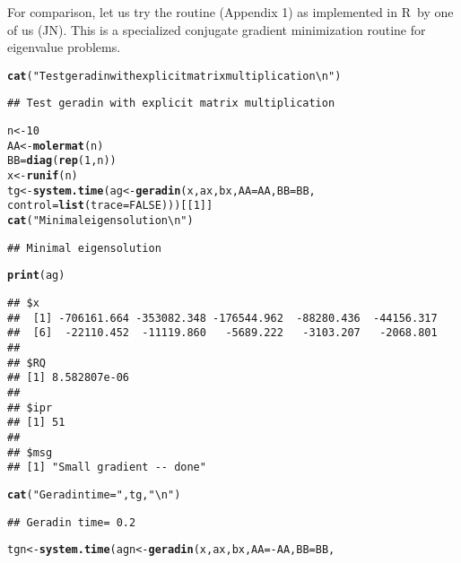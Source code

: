 \documentclass[10pt]{article}\usepackage[]{graphicx}\usepackage[]{color}
\makeatletter
\newcommand{\hlnum}[1]{\textcolor[rgb]{0.686,0.059,0.569}{#1}}%
\newcommand{\hlstr}[1]{\textcolor[rgb]{0.192,0.494,0.8}{#1}}%
\newcommand{\hlopt}[1]{\textcolor[rgb]{0,0,0}{#1}}%
\newcommand{\hlstd}[1]{\textcolor[rgb]{0.345,0.345,0.345}{#1}}%
\newcommand{\hlkwb}[1]{\textcolor[rgb]{0.69,0.353,0.396}{#1}}%
\newcommand{\hlkwc}[1]{\textcolor[rgb]{0.333,0.667,0.333}{#1}}%
\newcommand{\hlkwd}[1]{\textcolor[rgb]{0.737,0.353,0.396}{\textbf{#1}}}%
\newenvironment{kframe}{%
 \def\at@end@of@kframe{}%
 \ifinner\ifhmode%
  \def\at@end@of@kframe{\end{minipage}}%
  \begin{minipage}{\columnwidth}%
 \fi\fi%
 \def\FrameCommand##1{\hskip\@totalleftmargin \hskip-\fboxsep
 \colorbox{shadecolor}{##1}\hskip-\fboxsep
     \hskip-\linewidth \hskip-\@totalleftmargin \hskip\columnwidth}%
 \MakeFramed {\advance\hsize-\width
   \@totalleftmargin\z@ \linewidth\hsize
   \@setminipage}}%
 {\par\unskip\endMakeFramed%
 \at@end@of@kframe}
\newenvironment{knitrout}{}{} %
\newcommand{\R}{{\sf R\ }}
\makeatother
\begin{document}
For comparison, let us try the \cite{Geradin71} routine (Appendix 1) as implemented in \R by one of 
us (JN). This is a specialized conjugate gradient minimization routine for eigenvalue problems.



\begin{knitrout}\scriptsize
{}\color{fgcolor}\begin{kframe}
\begin{alltt}
\hlkwd{cat}\hlstd{(}\hlstr{"Test geradin with explicit matrix multiplication\textbackslash{}n"}\hlstd{)}
\end{alltt}
\begin{verbatim}
## Test geradin with explicit matrix multiplication
\end{verbatim}
\begin{alltt}
\hlstd{n}\hlkwb{<-}\hlnum{10}
\hlstd{AA}\hlkwb{<-}\hlkwd{molermat}\hlstd{(n)}
\hlstd{BB}\hlkwb{=}\hlkwd{diag}\hlstd{(}\hlkwd{rep}\hlstd{(}\hlnum{1}\hlstd{,n))}
\hlstd{x}\hlkwb{<-}\hlkwd{runif}\hlstd{(n)}
\hlstd{tg}\hlkwb{<-}\hlkwd{system.time}\hlstd{(ag}\hlkwb{<-}\hlkwd{geradin}\hlstd{(x, ax, bx,} \hlkwc{AA}\hlstd{=AA,} \hlkwc{BB}\hlstd{=BB,}
   \hlkwc{control}\hlstd{=}\hlkwd{list}\hlstd{(}\hlkwc{trace}\hlstd{=}\hlnum{FALSE}\hlstd{)))[[}\hlnum{1}\hlstd{]]}
\hlkwd{cat}\hlstd{(}\hlstr{"Minimal eigensolution\textbackslash{}n"}\hlstd{)}
\end{alltt}
\begin{verbatim}
## Minimal eigensolution
\end{verbatim}
\begin{alltt}
\hlkwd{print}\hlstd{(ag)}
\end{alltt}
\begin{verbatim}
## $x
##  [1] -706161.664 -353082.348 -176544.962  -88280.436  -44156.317
##  [6]  -22110.452  -11119.860   -5689.222   -3103.207   -2068.801
## 
## $RQ
## [1] 8.582807e-06
## 
## $ipr
## [1] 51
## 
## $msg
## [1] "Small gradient -- done"
\end{verbatim}
\begin{alltt}
\hlkwd{cat}\hlstd{(}\hlstr{"Geradin time="}\hlstd{,tg,}\hlstr{"\textbackslash{}n"}\hlstd{)}
\end{alltt}
\begin{verbatim}
## Geradin time= 0.2
\end{verbatim}
\begin{alltt}
\hlstd{tgn}\hlkwb{<-}\hlkwd{system.time}\hlstd{(agn}\hlkwb{<-}\hlkwd{geradin}\hlstd{(x, ax, bx,} \hlkwc{AA}\hlstd{=}\hlopt{-}\hlstd{AA,} \hlkwc{BB}\hlstd{=BB,}

\end{alltt}
\end{kframe}
\end{knitrout}
\end{document}
